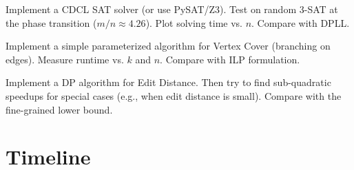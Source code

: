\begin{exercise}[Computational]
Implement a CDCL SAT solver (or use PySAT/Z3). Test on random 3-SAT at the phase transition ($m/n \approx 4.26$). Plot solving time vs. $n$. Compare with DPLL.
\end{exercise}

\begin{exercise}[Computational]
Implement a simple parameterized algorithm for Vertex Cover (branching on edges). Measure runtime vs. $k$ and $n$. Compare with ILP formulation.
\end{exercise}

\begin{exercise}[Computational]
Implement a DP algorithm for Edit Distance. Then try to find sub-quadratic speedups for special cases (e.g., when edit distance is small). Compare with the fine-grained lower bound.
\end{exercise}

\section{Timeline}
\label{sec:complexity:timeline}

